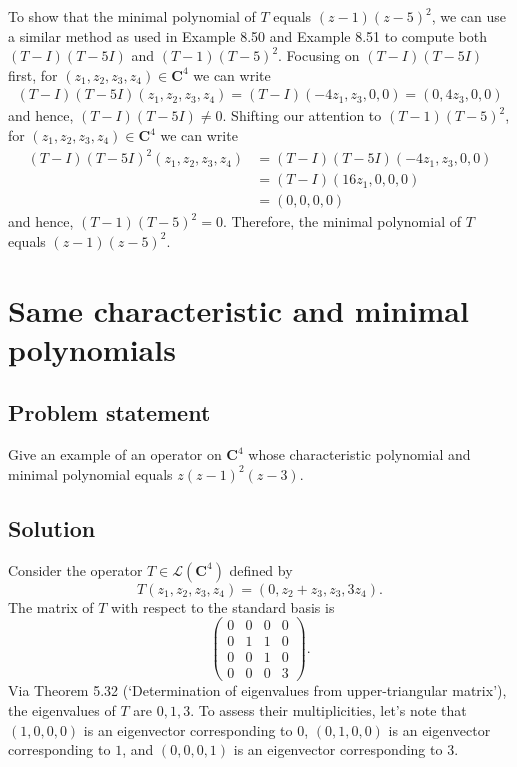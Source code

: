 \documentclass{article}
\begin{document}
To show that the minimal polynomial of $T$ equals $(z-1)(z-5)^2$, we can use a similar method as used in Example 8.50 and Example 8.51 to compute both $(T-I)(T-5I)$ and $(T-1)(T-5)^2$. 
Focusing on $(T-I)(T-5I)$ first, for $(z_1,z_2,z_3,z_4)\in\mathbf{C}^4$ we can write
\begin{align*}
    (T-I)(T-5I)(z_1,z_2,z_3,z_4)=(T-I)(-4z_1,z_3,0,0)=(0,4z_3,0,0)
\end{align*}
and hence, $(T-I)(T-5I)\neq 0$. 
Shifting our attention to $(T-1)(T-5)^2$, for $(z_1,z_2,z_3,z_4)\in\mathbf{C}^4$ we can write
\begin{align*}
    (T-I)(T-5I)^2(z_1,z_2,z_3,z_4)&=(T-I)(T-5I)(-4z_1,z_3,0,0)\\
    &=(T-I)(16z_1,0,0,0)\\
    &=(0,0,0,0)
\end{align*}
and hence, $(T-1)(T-5)^2 =0$. Therefore, the minimal polynomial of $T$ equals $(z-1)(z-5)^2$.

\clearpage

\section{Same characteristic and minimal polynomials}
\subsection*{Problem statement}
Give an example of an operator on $\mathbf{C}^4$ whose characteristic polynomial and minimal polynomial equals $z(z-1)^2(z-3)$.

\subsection*{Solution}
Consider the operator $T\in\mathcal{L}(\mathbf{C}^4)$ defined by
\begin{equation*}
T(z_1,z_2,z_3,z_4)=(0,z_2+z_3,z_3,3z_4).
\end{equation*}
The matrix of $T$ with respect to the standard basis is
\begin{equation*}
\begin{pmatrix}
0 & 0 & 0 & 0\\
0 & 1 & 1 & 0\\
0 & 0 & 1 & 0\\
0 & 0 & 0 & 3
\end{pmatrix}.
\end{equation*}
Via Theorem 5.32 (`Determination of eigenvalues from upper-triangular matrix'), the eigenvalues of $T$ are $0,1,3$. 
To assess their multiplicities, let's note that $(1,0,0,0)$ is an eigenvector corresponding to $0$, $(0,1,0,0)$ is an eigenvector corresponding to $1$, and $(0,0,0,1)$ is an eigenvector corresponding to $3$. 
\end{document}
